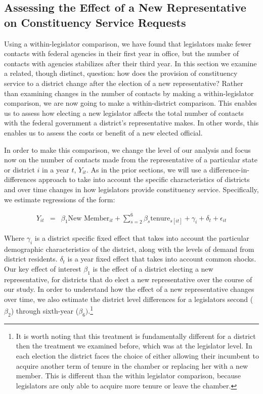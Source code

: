 \documentclass[12pt]{article}
\begin{document}
\subsection{Assessing the Effect of a New Representative on Constituency Service Requests}\label{s:tenure_dist}

Using a within-legislator comparison, we have found that legislators make fewer contacts with federal agencies in their first year in office, but the number of contacts with agencies stabilizes after their third year.  In this section we examine a related, though distinct, question: how does the provision of constituency service to a district change after the election of a new representative?  Rather than examining changes in the number of contacts by making a within-legislator comparison, we are now going to make a within-district comparison.  This enables us to assess how electing a new legislator affects the total number of contacts with the federal government a district's representative makes.  In other words, this enables us to assess the costs or benefit of a new elected official.    


In order to make this comparison, we change the level of our analysis and focus now on the number of contacts made from the representative of a particular state or district $i$ in a year $t$, $Y_{it}$.  As in the prior sections, we will use a difference-in-differences approach to take into account the specific characteristics of districts and over time changes in how legislators provide constituency service.  Specifically, we estimate regressions of the form: 


\begin{eqnarray}
Y_{it} & = & \beta_{1}\text{New Member}_{it} + \sum_{s = 2}^{6} \beta_{s} \text{tenure}_{s[it]} + \gamma_{i} + \delta_{t} + \epsilon_{it} \label{e:district1} 
\end{eqnarray}

Where $\gamma_{i}$ is a district specific fixed effect that takes into account the particular demographic characteristics of the district, along with the levels of demand from district residents.  $\delta_{t}$ is a year fixed effect that takes into account common shocks.  Our key effect of interest $\beta_{1}$ is the effect of a district electing a new representative, for districts that do elect a new representative over the course of our study.  In order to understand how the effect of a new representative changes over time, we also estimate the district level differences for a legislators second ($\beta_{2}$) through sixth-year ($\beta_{6})$.\footnote{It is worth noting that this treatment is fundamentally different for a district then the treatment we examined before, which was at the legislator level.  In each election the district faces the choice of either allowing their incumbent to acquire another term of tenure in the chamber or replacing her with a new member.  This is different than the within legislator comparison, because legislators are only able to acquire more tenure or leave the chamber.}
\end{document}
